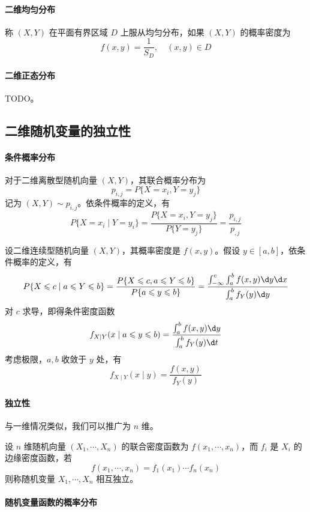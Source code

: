 \paragraph{二维均匀分布} 称 $(X,Y)$ 在平面有界区域 $D$ 上服从均匀分布，如果 $(X, Y)$ 的概率密度为
\[ f(x, y) = \frac{1}{S_D}, \quad (x, y) \in D \]

\paragraph{二维正态分布} TODO。

\subsection{二维随机变量的独立性}

\paragraph{条件概率分布}

对于二维离散型随机向量 $(X, Y)$，其联合概率分布为
\[ p_{i,j} = P\{X= x_i, Y = y_j\} \]
记为 $(X,Y) \sim p_{i,j}$。依条件概率的定义，有
\[ P\{ X = x_i \mid Y = y_i \} = \frac{P\{X = x_i, Y = y_j\}}{P\{Y=y_j\}} = \frac{p_{i, j}}{p_{, j}} \]

设二维连续型随机向量 $(X, Y)$，其概率密度是 $f(x, y)$。假设 $y \in [a, b]$，依条件概率的定义，有
\[ P\{X \leqslant c \mid a \leqslant Y \leqslant b\} = \frac{P\{X \leqslant c , a \leqslant Y \leqslant b\}}{P\{a \leqslant y \leqslant b \}} = \frac{\int_{-\infty}^c \int_{a}^b f(x, y) \d y \d x }{\int_a^b f_Y(y) \d y }\]
对 $c$ 求导，即得条件密度函数
\[ f_{X \mid Y}(x \mid a \leqslant y \leqslant b) = \frac{\int_{a}^b f(x, y) \d y}{\int_{a}^b f_{Y}(y) \d t} \]
考虑极限，$a, b$ 收敛于 $y$ 处，有
\[ f_{X \mid Y}(x \mid y) = \frac{f(x, y)}{f_{Y}(y)} \]

\paragraph{独立性}

与一维情况类似，我们可以推广为 $n$ 维。

\begin{definition}
	设 $n$ 维随机向量 $(X_1, \cdots, X_n)$ 的联合密度函数为 $f(x_1, \cdots, x_n)$，而 $f_i$ 是 $X_i$ 的边缘密度函数，若
	\[ f(x_1, \cdots, x_n) = f_1(x_1) \cdots f_n(x_n) \]
	则称随机变量 $X_1, \cdots, X_n$ 相互独立。
\end{definition}

\paragraph{随机变量函数的概率分布}

